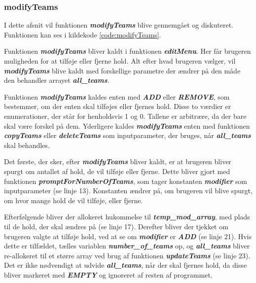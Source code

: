 \clearpage

\subsubsection{modifyTeams}\label{afsnit:modifyTeams}
I dette afsnit vil funktionen \textbf{\textit{modifyTeams}} blive gennemgået og diskuteret. Funktionen kan ses i kildekode \ref{code:modifyTeams}.
\par
Funktionen \textbf{\textit{modifyTeams}} bliver kaldt i funktionen \textbf{\textit{editMenu}}. Her får brugeren muligheden for at tilføje eller fjerne hold. Alt efter hvad brugeren vælger, vil \textbf{\textit{modifyTeams}} blive kaldt med forskellige parametre der ændrer på den måde den behandler arrayet \textbf{\textit{all\_teams}}.
\par
Funktionen \textbf{\textit{modifyTeams}} kaldes enten med \textbf{\textit{ADD}} eller \textbf{\textit{REMOVE}}, som bestemmer, om der enten skal tilføjes eller fjernes hold. Disse to værdier er enumerationer, der står for henholdsvis 1 og 0. Tallene er arbitrære, da der bare skal være forskel på dem. Yderligere kaldes \textbf{\textit{modifyTeams}} enten med funktionen \textbf{\textit{copyTeams}} eller \textbf{\textit{deleteTeams}} som inputparameter, der bruges, når \textbf{\textit{all\_teams}} skal behandles.
\par
Det første, der sker, efter \textbf{\textit{modifyTeams}} bliver kaldt, er at brugeren bliver spurgt om antallet af hold, de vil tilføje eller fjerne. Dette bliver gjort med funktionen \textbf{\textit{promptForNumberOfTeams}}, som tager konstanten \textbf{\textit{modifier}} som inputparameter (se linje 13). Konstanten ændrer på, om brugeren vil blive spurgt, om hvor mange hold de vil tilføje, eller fjerne. 
\par
Efterfølgende bliver der allokeret hukommelse til \textbf{\textit{temp\_mod\_array}}, med plads til de hold, der skal ændres på (se linje 17). Derefter bliver der tjekket om brugeren valgte at tilføje hold, ved at se om \textbf{\textit{modifier}} er \textbf{\textit{ADD}} (se linje 21). Hvis dette er tilfældet, tælles variablen \textbf{\textit{number\_of\_teams}} op, og \textbf{\textit{all\_teams}} bliver re-allokeret til et større array ved brug af funktionen \textbf{\textit{updateTeams}} (se linje 23). Det er ikke nødvendigt at udvide \textbf{\textit{all\_teams}}, når der skal fjernes hold, da disse bliver markeret med \textbf{\textit{EMPTY}} og ignoreret af resten af programmet.
\par
